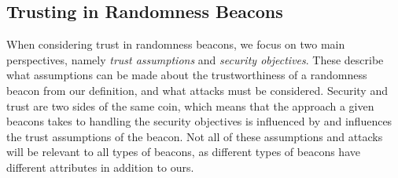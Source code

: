 \subsection{Trusting in Randomness Beacons}
When considering trust in randomness beacons, we focus on two main perspectives, namely \emph{trust assumptions} and \emph{security objectives}.
These describe what assumptions can be made about the trustworthiness of a randomness beacon from our definition, and what attacks must be considered.
Security and trust are two sides of the same coin, which means that the approach a given beacons takes to handling the security objectives is influenced by and influences the trust assumptions of the beacon.
Not all of these assumptions and attacks will be relevant to all types of beacons, as different types of beacons have different attributes in addition to ours.

